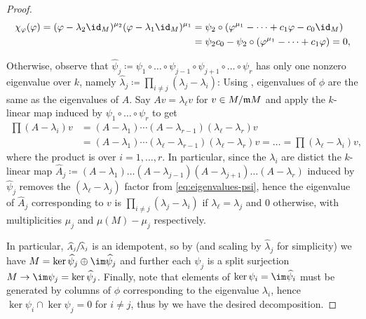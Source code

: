 \documentclass[12pt]{article}
\def\wpsi{\widehat\psi}
\theoremstyle{theorem}
\numberwithin{thm}{section}
\theoremstyle{definition}
\newcommand{\devlin}[1]{{\color{red} \sf $\clubsuit$ Devlin: [#1]}}
\begin{document}
\begin{proof}
  \begin{align*}
  \chi_\phi(\phi) = (\phi - \lambda_2\id_M)^{\mu_2} (\phi - \lambda_1\id_M)^{\mu_1}
  &= \psi_2\circ\left(\phi^{\mu_1} - \dots + c_1\phi - c_0\id_M\right) \\
  &= \psi_2 c_0 - \psi_2\circ \left(\phi^{\mu_1} - \dots + c_1\phi\right) = 0,
  \end{align*}



  

  Otherwise, observe that $\wpsi_j\coloneqq \psi_1\circ\dots\circ\psi_{j-1}\circ\psi_{j+1}\circ\dots\circ\psi_r $ has only one nonzero eigenvalue over $k$, namely $\widehat\lambda_j \coloneqq \prod_{i\neq j}(\lambda_j-\lambda_i)$: Using , eigenvalues of $\phi$ are the same as the eigenvalues of $A$. Say $A v = \lambda_\ell v$ for $v\in M/\mathfrak m M$ and apply the $k$-linear map induced by $\psi_1\circ\dots\circ\psi_r$ to get
  \begin{align}\label{eq:eigenvalues-psi}
    \prod(A-\lambda_i)v
    &= (A - \lambda_1)\cdots(A - \lambda_{r-1})(\lambda_\ell - \lambda_r)v \nonumber \\
    &= (A - \lambda_1)\cdots(\lambda_\ell - \lambda_{r-1})(\lambda_\ell - \lambda_r)v
    = \dots = \prod(\lambda_\ell - \lambda_i)v,
  \end{align}
  where the product is over $i=1,\dots,r$. In particular, since the $\lambda_i$ are distict the $k$-linear map $\widehat A_j\coloneqq (A - \lambda_1)\dots(A-\lambda_{j-1})(A - \lambda_{j+1})\dots(A - \lambda_r)$ induced by $\wpsi_j$ removes the $(\lambda_\ell-\lambda_j)$ factor from \eqref{eq:eigenvalues-psi}, hence the eigenvalue of $\widehat A_j$ corresponding to $v$ is $\prod_{i\neq j}(\lambda_j-\lambda_i)$ if $\lambda_\ell=\lambda_j$ and 0 otherwise, with multiplicities $\mu_j$ and $\mu(M) - \mu_j$ respectively.

  In particular, $\sfrac{\widehat A_j}{\widehat\lambda_j}$ is an idempotent, so by  (and scaling by $\widehat\lambda_j$ for simplicity) we have $M = \ker\wpsi_j \oplus \im\wpsi_j$ and further each $\psi_j$ is a split surjection $M\to\im\psi_j = \ker\wpsi_j$. Finally, note that elements of $\ker\psi_i = \im\wpsi_i$ must be generated by columns of $\phi$ corresponding to the eigenvalue $\lambda_i$, hence $\ker\psi_i \cap \ker\psi_j = 0$ for $i\neq j$, thus by  we have the desired decomposition.
\end{proof}
\end{document}
